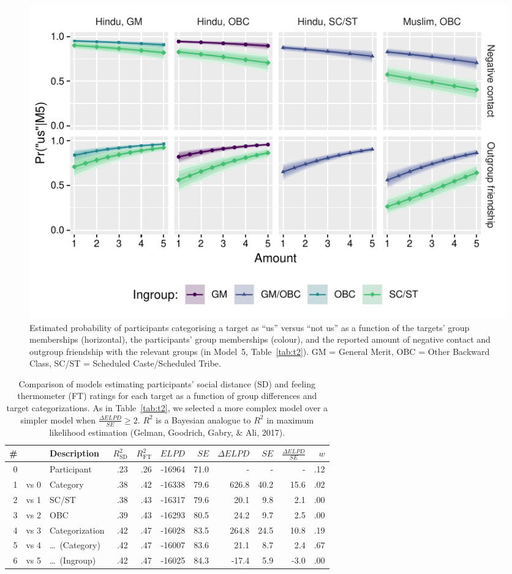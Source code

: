\documentclass[12pt, a4paper]{article}
\begin{document}
\begin{figure}
\centering
\includegraphics[scale=1]{../figures/figure-4}
\caption{Estimated probability of participants categorising a target as ``us'' versus ``not us'' as a function of the targets' group memberships (horizontal), the participants' group memberships (colour), and the reported amount of negative contact and outgroup friendship with the relevant groups (in Model~5, Table~\ref{tab:t2}). GM = General Merit, OBC = Other Backward Class, SC/ST = Scheduled Caste/Scheduled Tribe.}
\label{fig:f4}
\end{figure}

\begin{table}
\caption{Comparison of models estimating participants' social distance (SD) and feeling thermometer (FT) ratings for each target as a function of group differences and target categorizations. As in Table~\ref{tab:t2}, we selected a more complex model over a simpler model when $\frac{\Delta\textit{ELPD}}{\textit{SE}} \geq 2$. $R^2$ is a Bayesian analogue to $R^2$ in maximum likelihood estimation (Gelman, Goodrich, Gabry, \& Ali, 2017).}
\centering
{}
\small	
\begin{tabularx}{\linewidth}{r@{~}rXrrrrrrrr} \toprule
\# &  & Description & $R^2_\text{SD}$ & $R^2_\text{FT}$ & $\textit{ELPD}$ & $\textit{SE}$ & $\Delta\textit{ELPD}$ & $\textit{SE}$ & $\frac{\Delta\textit{ELPD}}{\textit{SE}}$ & $w$ \\ \midrule 
0 &      & Participant & .23 & .26 & -16964 & 71.0 & - & - & - & .12 \\
1 & vs 0 & Category & .38 & .42 & -16338 & 79.6 & 626.8 & 40.2 & 15.6 & .02 \\
2 & vs 1 & SC/ST    & .38 & .43 & -16317 & 79.6 &  20.1 &  9.8 &  2.1 & .00 \\
3 & vs 2 & OBC      & .39 & .43 & -16293 & 80.5 &  24.2 &  9.7 &  2.5 & .00 \\ \midrule
4 & vs 3 & Categorization    & .42 & .47 & -16028 & 83.5 & 264.8 & 24.5 & 10.8 & .19 \\
5 & vs 4 & \ldots~(Category) & .42 & .47 & -16007 & 83.6 &  21.1 &  8.7 &  2.4 & .67 \\
6 & vs 5 & \ldots~(Ingroup)  & .42 & .47 & -16025 & 84.3 & -17.4 &  5.9 & -3.0 & .00 \\
\bottomrule    
\end{tabularx}
\label{tab:t3}
\end{table}
\end{document}
